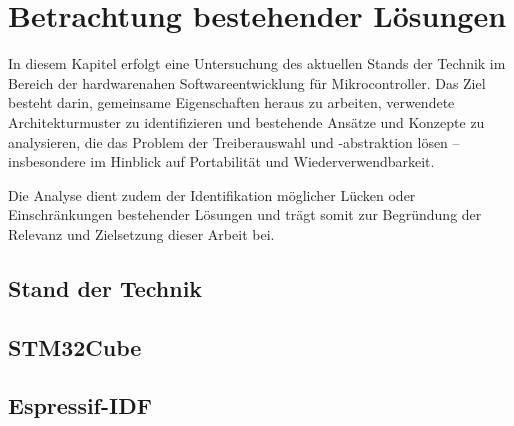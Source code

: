 \section{Betrachtung bestehender Lösungen}
In diesem Kapitel erfolgt eine Untersuchung des aktuellen Stands der Technik im Bereich der hardwarenahen Softwareentwicklung für Mikrocontroller.
Das Ziel besteht darin, gemeinsame Eigenschaften heraus zu arbeiten, verwendete Architekturmuster zu identifizieren und bestehende Ansätze und Konzepte zu analysieren, die das Problem der Treiberauswahl und -abstraktion lösen – insbesondere im Hinblick auf Portabilität und Wiederverwendbarkeit. 

Die Analyse dient zudem der Identifikation möglicher Lücken oder Einschränkungen bestehender Lösungen und trägt somit zur Begründung der Relevanz und Zielsetzung dieser Arbeit bei.


\subsection{Stand der Technik}


\subsection{STM32Cube}


\subsection{Espressif-IDF}



